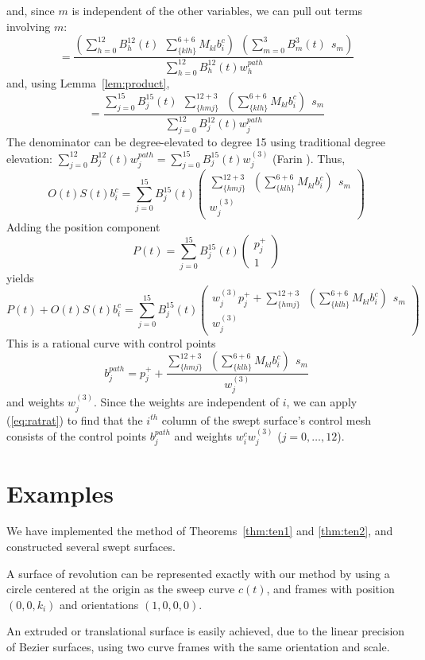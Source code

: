 and, since $m$ is independent of the other variables, 
we can pull out terms involving $m$:
\[
 = \frac{(\sum_{h=0}^{12} B_h^{12}(t) \ \ \sum_{\{klh\}}^{6+6} M_{kl} b_i^c) 
	\ \ (\sum_{m=0}^3 B_m^3(t) \ \ s_m)}
     {\sum_{h=0}^{12} B_h^{12}(t) w_h^{path}}
\]
and, using Lemma~\ref{lem:product},
\[
= \frac{\sum_{j=0}^{15} B_j^{15}(t) \ \ \sum_{\{hmj\}}^{12+3} \ \ 
		(\sum_{\{klh\}}^{6+6} M_{kl} b_i^c) \ \ s_m}
     {\sum_{j=0}^{12} B_j^{12}(t) w_j^{path}}
\]
The denominator can be degree-elevated to degree 15 using 
traditional degree elevation:
$\sum_{j=0}^{12} B_j^{12}(t) w_j^{path} = 
 \sum_{j=0}^{15} B_j^{15}(t) w^{(3)}_j$ (Farin \cite{farin93}).
Thus,
\[
O(t)S(t)b_i^c = \sum_{j=0}^{15} B_j^{15}(t) 
	\left(	\begin{array}{c}
	\sum_{\{hmj\}}^{12+3} \ \ 
		(\sum_{\{klh\}}^{6+6} M_{kl} b_i^c) \ \ s_m
	\\ w^{(3)}_j
	\end{array} \right)
\]
Adding the position component
\[
P(t) = 	\sum_{j=0}^{15} B_j^{15}(t) 
	\left(	\begin{array}{c}
	p_j^{+} \\ 1
	\end{array} \right)
\]
yields
\[
P(t) + O(t)S(t)b_i^c = 
\sum_{j=0}^{15} B_j^{15}(t) 
	\left(	\begin{array}{c}
	w^{(3)}_j p_j^{+} + 
	\sum_{\{hmj\}}^{12+3} \ \ 
		(\sum_{\{klh\}}^{6+6} M_{kl} b_i^c) \ \ s_m
	\\ w^{(3)}_j
	\end{array} \right)
\]
This is a rational curve with control points
\[
	b_j^{path} = p_j^{+} + \frac{\sum_{\{hmj\}}^{12+3} \ \ 
		(\sum_{\{klh\}}^{6+6} M_{kl} b_i^c) \ \ s_m}{w^{(3)}_j}
\]
and weights $w^{(3)}_j$.
Since the weights are independent of $i$, we can apply (\ref{eq:ratrat})
to find that the $i^{th}$ column of the swept surface's control mesh
consists of the control points $b_j^{path}$ and weights 
$w_i^c  w^{(3)}_j$ ($j=0,\ldots,12$).
\QED

\section{Examples}

We have implemented the method of Theorems~\ref{thm:ten1} and \ref{thm:ten2},
and constructed several swept surfaces.

\begin{rmk}
A surface of revolution can be represented exactly with our method
by using a circle 
centered at the origin
as the sweep curve $c(t)$, and frames with position $(0,0,k_i)$ and 
orientations $(1,0,0,0)$.

An extruded  or translational surface is easily achieved, due to
the linear precision of Bezier surfaces, using two curve frames
with the same orientation and scale.
\end{rmk}

